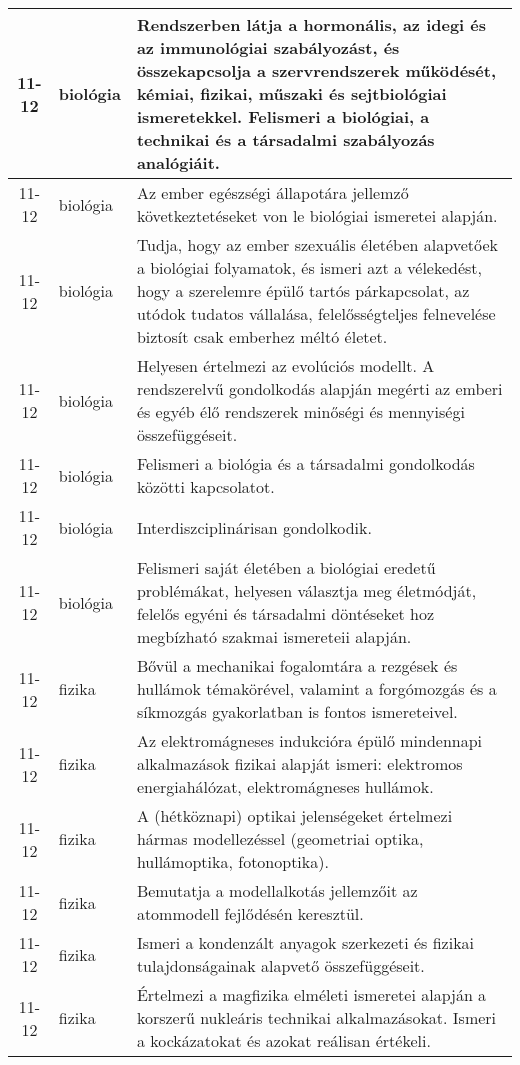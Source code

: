 \begin{small}
\begin{longtable}{c | p{2cm} |  p{11cm} }
              11-12 & biológia & Rendszerben látja a hormonális, az idegi és az immunológiai szabályozást, és összekapcsolja a szervrendszerek működését, kémiai, fizikai, műszaki és sejtbiológiai ismeretekkel. Felismeri a biológiai, a technikai és a társadalmi szabályozás analógiáit. \\ \hline
              11-12 & biológia & Az ember egészségi állapotára jellemző következtetéseket von le biológiai ismeretei alapján. \\ \hline
              11-12 & biológia & Tudja, hogy az ember szexuális életében alapvetőek a biológiai folyamatok, és ismeri azt a vélekedést, hogy a szerelemre épülő tartós párkapcsolat, az utódok tudatos vállalása, felelősségteljes felnevelése biztosít csak emberhez méltó életet. \\ \hline
              11-12 & biológia & Helyesen értelmezi az evolúciós modellt. A rendszerelvű gondolkodás alapján megérti az emberi és egyéb élő rendszerek minőségi és mennyiségi összefüggéseit. \\ \hline
              11-12 & biológia & Felismeri a biológia és a társadalmi gondolkodás közötti kapcsolatot. \\ \hline
              11-12 & biológia & Interdiszciplinárisan gondolkodik. \\ \hline
              11-12 & biológia & Felismeri saját életében a biológiai eredetű problémákat, helyesen választja meg életmódját, felelős egyéni és társadalmi döntéseket hoz megbízható szakmai ismereteii alapján. \\ \hline
              11-12 & fizika & Bővül a mechanikai fogalomtára a rezgések és hullámok témakörével, valamint a forgómozgás és a síkmozgás gyakorlatban is fontos ismereteivel. \\ \hline
              11-12 & fizika & Az elektromágneses indukcióra épülő mindennapi alkalmazások fizikai alapját ismeri: elektromos energiahálózat, elektromágneses hullámok. \\ \hline
              11-12 & fizika & A (hétköznapi) optikai jelenségeket értelmezi hármas modellezéssel (geometriai optika, hullámoptika, fotonoptika). \\ \hline
              11-12 & fizika & Bemutatja a modellalkotás jellemzőit az atommodell fejlődésén keresztül. \\ \hline
              11-12 & fizika & Ismeri a kondenzált anyagok szerkezeti és fizikai tulajdonságainak alapvető összefüggéseit. \\ \hline
              11-12 & fizika & Értelmezi a magfizika elméleti ismeretei alapján a korszerű nukleáris technikai alkalmazásokat. Ismeri a kockázatokat és azokat reálisan értékeli. \\ \hline

\end{longtable}
\end{small}
